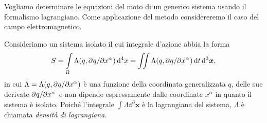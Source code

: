 
Vogliamo determinare le equazioni del moto di un generico sistema usando il
formalismo lagrangiano. Come applicazione del metodo considereremo il caso del
campo elettromagnetico.

Consideriamo un sistema isolato il cui integrale d'azione abbia la forma
\begin{equation}
  \label{eq:azione-campo}
  S = \int\limits_{\Omega} \Lambda (q, \partial^{} q / \partial {x^{\alpha}}^{}) \mathop{}\!\mathrm{d}^{4} x
  = \iint \Lambda (q, \partial^{} q / \partial {x^{\alpha}}^{}) \mathop{}\!\mathrm{d} t\mathop{}\!\mathrm{d}^{3} \bm{x},
\end{equation}
in cui $\Lambda = \Lambda(q, \partial^{} q / \partial {x^{\alpha}}^{})$ è una funzione della
coordinata generalizzata $q$, delle sue derivate $\partial^{} q / \partial {x^{\alpha}}^{}$ e non
dipende espressamente dalle coordinate $x^{\alpha}$ in quanto il sistema è
isolato.  Poiché l'integrale $\int \Lambda\dd^{3} \bm{x}$ è la lagrangiana del
sistema, $\Lambda$ è chiamata \emph{densità di
  lagrangiana}.

